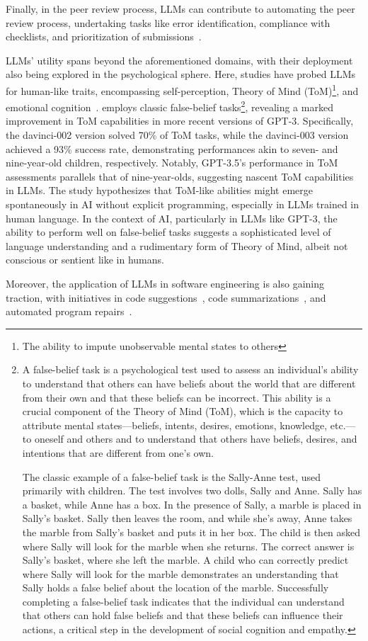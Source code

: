 Finally, in the peer review process, LLMs can contribute to automating the peer review process, undertaking tasks like error identification, compliance with checklists, and prioritization of submissions~\cite{liu2023reviewergpt}.

LLMs' utility spans beyond the aforementioned domains, with their deployment also being explored in the psychological sphere.
Here, studies have probed LLMs for human-like traits, encompassing self-perception, Theory of Mind (ToM)\footnote{The ability to impute unobservable mental states to others}, and emotional cognition~\cite{kosinski2023theoryofmind, amin2023affectivecomputing}.
\textcite{kosinski2023theoryofmind} employs classic false-belief tasks\footnote{A false-belief task is a psychological test used to assess an individual's ability to understand that others can have beliefs about the world that are different from their own and that these beliefs can be incorrect. This ability is a crucial component of the Theory of Mind (ToM), which is the capacity to attribute mental states—beliefs, intents, desires, emotions, knowledge, etc.—to oneself and others and to understand that others have beliefs, desires, and intentions that are different from one's own.

	The classic example of a false-belief task is the Sally-Anne test, used primarily with children. The test involves two dolls, Sally and Anne. Sally has a basket, while Anne has a box. In the presence of Sally, a marble is placed in Sally's basket. Sally then leaves the room, and while she's away, Anne takes the marble from Sally's basket and puts it in her box. The child is then asked where Sally will look for the marble when she returns. The correct answer is Sally's basket, where she left the marble. A child who can correctly predict where Sally will look for the marble demonstrates an understanding that Sally holds a false belief about the location of the marble.
	Successfully completing a false-belief task indicates that the individual can understand that others can hold false beliefs and that these beliefs can influence their actions, a critical step in the development of social cognition and empathy.}, revealing a marked improvement in ToM capabilities in more recent versions of GPT-3.
Specifically, the davinci-002 version solved 70\% of ToM tasks, while the davinci-003 version achieved a 93\% success rate, demonstrating performances akin to seven- and nine-year-old children, respectively.
Notably, GPT-3.5's performance in ToM assessments parallels that of nine-year-olds, suggesting nascent ToM capabilities in LLMs.
The study hypothesizes that ToM-like abilities might emerge spontaneously in AI without explicit programming, especially in LLMs trained in human language.
In the context of AI, particularly in LLMs like GPT-3, the ability to perform well on false-belief tasks suggests a sophisticated level of language understanding and a rudimentary form of Theory of Mind, albeit not conscious or sentient like in humans.

Moreover, the application of LLMs in software engineering is also gaining traction, with initiatives in code suggestions~\cite{sridhara2023chatgptsoftware}, code summarizations~\cite{sun2023code}, and automated program repairs~\cite{xia2023conversationalrepair}.